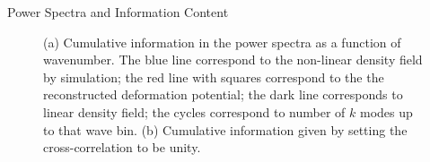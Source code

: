 \begin{section}{Power Spectra and Information Content}
\begin{figure}[t!]
\centering
   \caption{(a) Cumulative information in the power spectra as a function of wavenumber. The blue 
line correspond to the non-linear density field by simulation; the red line with squares correspond 
to the the reconstructed deformation potential; the dark line corresponds to linear density 
field; the cycles correspond to number of $k$ modes up to that wave bin. (b) Cumulative information 
given by setting the cross-correlation to be unity.}
  \label{fig:fisherinfo}

\end{figure}

\end{section}
